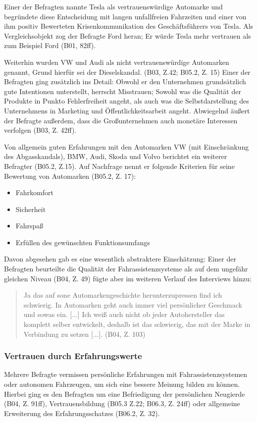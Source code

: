 \documentclass[12pt]{article}
\begin{document}
Einer der Befragten nannte Tesla als vertrauenswürdige Automarke und begründete diese Entscheidung mit langen unfallfreien Fahrzeiten und einer von ihm positiv Bewerteten Krisenkommunikation des Geschäftsführers von Tesla. Als Vergleichsobjekt zog der Befragte Ford heran; Er würde Tesla mehr vertrauen als zum Beispiel Ford (B01, 82ff).

Weiterhin wurden VW und Audi als nicht vertrauenswürdige Automarken genannt, Grund hierfür sei der Dieselskandal. (B03, Z.42; B05.2, Z. 15) Einer der Befragten ging zusätzlich ins Detail: Obwohl er den Unternehmen grundsätzlich gute Intentionen unterstellt, herrscht Misstrauen; Sowohl was die Qualität der Produkte in Punkto Fehlerfreiheit angeht, als auch was die Selbstdarstellung des Unternehmens in Marketing und Öffentlichkeitsarbeit angeht. Abwiegelnd äußert der Befragte außerdem, dass die Großunternehmen auch monetäre Interessen verfolgen (B03, Z. 42ff).

Von allgemein guten Erfahrungen mit den Automarken VW (mit Einschränkung des Abgasskandals), BMW, Audi, Skoda und Volvo berichtet ein weiterer Befragter (B05.2, Z.15). Auf Nachfrage nennt er folgende Kriterien für seine Bewertung von Automarken (B05.2, Z. 17):
\begin{itemize}
  \item Fahrkomfort
  \item Sicherheit
  \item Fahrspaß
  \item Erfüllen des gewünschten Funktionsumfangs
\end{itemize}

Davon abgesehen gab es eine wesentlich abstraktere Einschätzung: Einer der Befragten beurteilte die Qualität der Fahrassistenzsysteme als \glqq auf dem ungefähr gleichen Niveau\grqq{} (B04, Z. 49) fügte aber im weiteren Verlauf des Interviews hinzu:

\begin{quote}
  Ja das auf sone Automarkengeschichte herunterzupressen find ich schwierig. In Automarken geht auch immer viel persönlicher Geschmack und sowas ein. [...] Ich weiß auch nicht ob jeder Autohersteller das komplett selber entwickelt, deshalb ist das schwierig, das mit der Marke in Verbindung zu setzen [...]. (B04, Z. 103)
\end{quote}

\subsubsection*{Vertrauen durch Erfahrungswerte}
Mehrere Befragte vermissen persönliche Erfahrungen mit Fahrassistenzsystemen oder autonomen Fahrzeugen, um sich eine bessere Meinung bilden zu können. Hierbei ging es den Befragten um eine Befriedigung der persönlichen Neugierde (B04, Z. 91ff), Vertrauensbildung (B05.3 Z.22; B06.3, Z. 24ff) oder allgemeine Erweiterung des Erfahrungsschatzes (B06.2, Z. 32).
\end{document}
